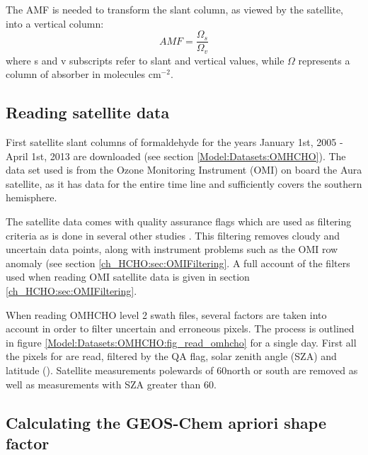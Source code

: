   The AMF is needed to transform the slant column, as viewed by the satellite, into a vertical column:
  \begin{equation}
  \label{eqn:AMFratio}
  AMF = \frac{\Omega_s}{\Omega_v} %
  \end{equation}
  where s and v subscripts refer to slant and vertical values, while $\Omega$ represents a column of absorber in molecules cm$^{-2}$.
  
  
  \subsection{Reading satellite data}
    
    First satellite slant columns of formaldehyde for the years January 1st, 2005 - April 1st, 2013 are downloaded (see section \ref{Model:Datasets:OMHCHO}).
    The data set used is from the Ozone Monitoring Instrument (OMI) on board the Aura satellite, as it has data for the entire time line and sufficiently covers the southern hemisphere.
    
    The satellite data comes with quality assurance flags which are used as filtering criteria as is done in several other studies \citep[eg.]{Marais2012, Barkley2013, Bauwens2016, Zhu2016}.
    This filtering removes cloudy and uncertain data points, along with instrument problems such as the OMI row anomaly (see section \ref{ch_HCHO:sec:OMIFiltering}.
    A full account of the filters used when reading OMI satellite data is given in section \ref{ch_HCHO:sec:OMIFiltering}.
    
    When reading OMHCHO level 2 swath files, several factors are taken into account in order to filter uncertain and erroneous pixels.
    The process is outlined in figure  \ref{Model:Datasets:OMHCHO:fig_read_omhcho} for a single day.
    First all the pixels for are read, filtered by the QA flag, solar zenith angle (SZA) and latitude (\cite{Palmer2001}).
    Satellite measurements polewards of 60\degr north or south are removed as well as measurements with SZA greater than 60\degr.
  
  \subsection{Calculating the GEOS-Chem apriori shape factor}
    
